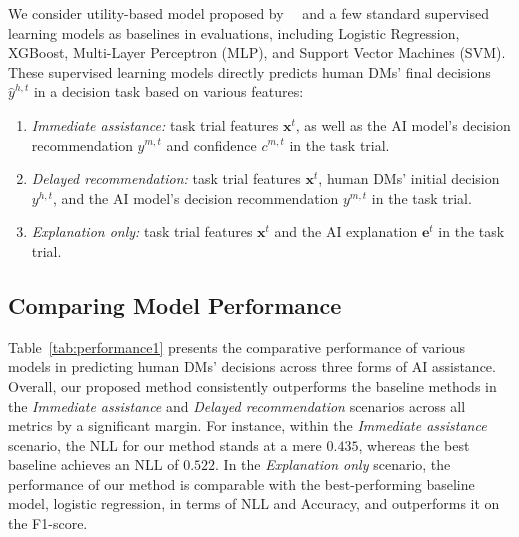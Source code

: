 \documentclass[letterpaper]{article} %
\begin{document}
We consider utility-based  model proposed by~\citeauthor{wang2022will}~ and  a few standard supervised learning models as baselines in evaluations, including Logistic Regression, XGBoost, Multi-Layer Perceptron (MLP), and Support Vector Machines (SVM). These supervised learning models directly predicts human DMs' final decisions $\hat{y}^{h,t}$ in a decision task based on various features:
\begin{enumerate}
    \item \emph{Immediate assistance:} task trial features $\bm{x}^t$, as well as the AI model's decision recommendation $y^{m,t}$ and confidence $c^{m,t}$ in the task trial.
    \item  \emph{Delayed recommendation:} task trial features $\bm{x}^t$, human DMs' initial decision $y^{h,t}$,
    and the AI model's decision recommendation $y^{m,t}$ in the task trial.

    \item \emph{Explanation only:} task trial features $\bm{x}^t$ and the AI explanation $\bm{e}^t$ in the task trial.
\end{enumerate}



\subsection{Comparing Model Performance}
Table~\ref{tab:performance1} presents the comparative performance of various models in predicting human DMs' decisions across three forms of AI assistance. Overall, our proposed method consistently outperforms the baseline methods in the \emph{Immediate assistance} and \emph{Delayed recommendation} scenarios across all metrics by a significant margin. For instance, within the \emph{Immediate assistance} scenario, the NLL for our method stands at a mere $0.435$, whereas the best baseline achieves an NLL of $0.522$. In the \emph{Explanation only} scenario, the performance of our method is comparable with the best-performing baseline model, logistic regression, in terms of NLL and Accuracy, and outperforms it on the F1-score.
\end{document}
